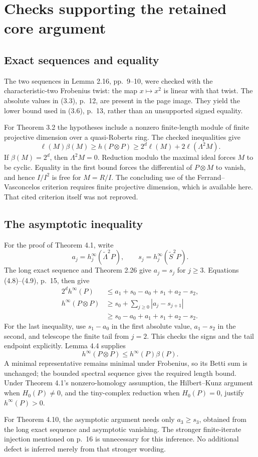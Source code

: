 \documentclass[10pt]{article}
\begin{document}
\section*{Checks supporting the retained core argument}
\subsection*{Exact sequences and equality}
The two sequences in Lemma 2.16, pp. 9–10, were checked with the characteristic-two Frobenius twist: the map \(x\mapsto x^2\) is linear with that twist. The absolute values in (3.3), p. 12, are present in the page image. They yield the lower bound used in (3.6), p. 13, rather than an unsupported signed equality.\par
For Theorem 3.2 the hypotheses include a nonzero finite-length module of finite projective dimension over a quasi-Roberts ring. The checked inequalities give \[\ell(M)\beta(M)\ge h(P\otimes P)
 \ge 2^d\ell(M)+2\ell(\Lambda^2M).\] If \(\beta(M)=2^d\), then \(\Lambda^2M=0\). Reduction modulo the maximal ideal forces \(M\) to be cyclic. Equality in the first bound forces the differential of \(P\otimes M\) to vanish, and hence \(I/I^2\) is free for \(M=R/I\). The concluding use of the Ferrand–Vasconcelos criterion requires finite projective dimension, which is available here. That cited criterion itself was not reproved.\par
\subsection*{The asymptotic inequality}
For the proof of Theorem 4.1, write \[a_j=h_j^\infty(\widetilde\Lambda^2P),\qquad
 s_j=h_j^\infty(\widetilde S^2P).\] The long exact sequence and Theorem 2.26 give \(a_j=s_j\) for \(j\ge3\). Equations (4.8)–(4.9), p. 15, then give \[\begin{aligned}
 2^d h^\infty(P)&\le a_1+s_0-a_0+s_1+a_2-s_2,\\
 h^\infty(P\otimes P)&\ge s_0+\sum_{j\ge0}|a_j-s_{j+1}|\\
 &\ge s_0-a_0+a_1+s_1+a_2-s_2.\end{aligned}\] For the last inequality, use \(s_1-a_0\) in the first absolute value, \(a_1-s_2\) in the second, and telescope the finite tail from \(j=2\). This checks the signs and the tail endpoint explicitly. Lemma 4.4 supplies \[h^\infty(P\otimes P)\le h^\infty(P)\beta(P).\] A minimal representative remains minimal under Frobenius, so its Betti sum is unchanged; the bounded spectral sequence gives the required length bound. Under Theorem 4.1’s nonzero-homology assumption, the Hilbert–Kunz argument when \(H_0(P)\ne0\), and the tiny-complex reduction when \(H_0(P)=0\), justify \(h^\infty(P)>0\).\par
For Theorem 4.10, the asymptotic argument needs only \(a_3\ge s_3\), obtained from the long exact sequence and asymptotic vanishing. The stronger finite-iterate injection mentioned on p. 16 is unnecessary for this inference. No additional defect is inferred merely from that stronger wording.\par
\end{document}
